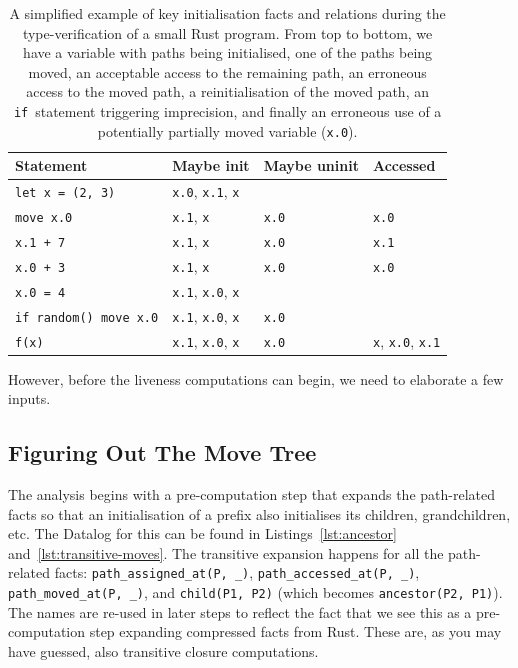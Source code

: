 \documentclass[11pt,a4paper,twoside,openany]{report}
\newcommand{\InRust}[1]{\texttt{#1}}
\newcommand{\InDatalog}[1]{\texttt{#1}}
\renewcommand\_{\textunderscore\allowbreak}
\begin{document}
{\renewcommand{\arraystretch}{1.0}
  \begin{table}    
\begin{tabular}{@{}l l l l}
  Statement                & Maybe init                 & Maybe uninit            & Accessed \\ \toprule
  \InRust{let x = (2, 3)} & \InRust{x.0}, \InRust{x.1}, \InRust{x} &  & \\
  \InRust{move x.0}        & \InRust{x.1}, \InRust{x}               & \InRust{x.0} & \InRust{x.0} \\ %
  \InRust{x.1 + 7}         & \InRust{x.1}, \InRust{x}               & \InRust{x.0} & \InRust{x.1} \\ %
  \InRust{x.0 + 3}         & \InRust{x.1}, \InRust{x}               & \InRust{x.0} & \InRust{x.0} \\ %
  \InRust{x.0 = 4}         & \InRust{x.1}, \InRust{x.0}, \InRust{x} &   \\ %
  \InRust{if random() {move x.0}}  & \InRust{x.1}, \InRust{x.0}, \InRust{x} & \InRust{x.0}        \\ %
  \InRust{f(x)}  & \InRust{x.1}, \InRust{x.0}, \InRust{x} & \InRust{x.0} & \InRust{x}, \InRust{x.0}, \InRust{x.1}       \\ %
\end{tabular}
\caption[Move Error Example]{A simplified example of key initialisation facts
  and relations during the type-verification of a small Rust program. From top
  to bottom, we have a variable with paths being initialised, one of the paths
  being moved, an acceptable access to the remaining path, an erroneous access
  to the moved path, a reinitialisation of the moved path, an
  \InRust{if}~statement triggering imprecision, and finally an erroneous use of
  a potentially partially moved variable
  (\InRust{x.0}).}\label{tab:move-example}
\end{table}%
 }

However, before the liveness computations can begin, we need to elaborate a few
inputs.

\subsection{Figuring Out The Move Tree}\label{sec:move:fixpoints}

The analysis begins with a pre-computation step that expands the path-related
facts so that an initialisation of a prefix also initialises its children,
grandchildren, etc. The Datalog for this can be found in
Listings~\ref{lst:ancestor} and~\ref{lst:transitive-moves}. The transitive
expansion happens for all the path-related facts: \InDatalog{path_assigned_at(P,
  _)}, \InDatalog{path_accessed_at(P, _)}, \InDatalog{path_moved_at(P, _)}, and
\InDatalog{child(P1, P2)} (which becomes \InDatalog{ancestor(P2, P1)}). The
names are re-used in later steps to reflect the fact that we see this as a
pre-computation step expanding compressed facts from Rust. These are, as you may
have guessed, also transitive closure computations.
\end{document}
